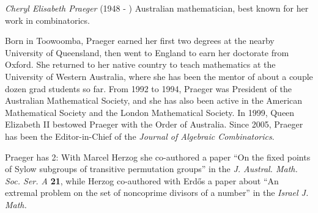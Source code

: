 \documentclass[12pt]{article}
\begin{document}

\emph{Cheryl Elisabeth Praeger} (1948 - ) Australian mathematician, best known for her work in combinatorics.

Born in Toowoomba, Praeger earned her first two degrees at the nearby University of Queensland, then went to England to earn her doctorate from Oxford. She returned to her native country to teach mathematics at the University of Western Australia, where she has been the mentor of about a couple dozen grad students so far. From 1992 to 1994, Praeger was President of the Australian Mathematical Society, and she has also been active in the American Mathematical Society and the London Mathematical Society. In 1999, Queen Elizabeth II bestowed Praeger with the Order of Australia. Since 2005, Praeger has been the Editor-in-Chief of the {\it Journal of Algebraic Combinatorics}.

Praeger has  2: With Marcel Herzog she co-authored a paper ``On the fixed points of Sylow subgroups of transitive permutation groups'' in the {\it J. Austral. Math. Soc. Ser. A} {\bf 21}, while Herzog co-authored with  Erd\H{o}s a paper about ``An extremal problem on the set of noncoprime divisors of a number'' in the {\it Israel J. Math.}
\end{document}
